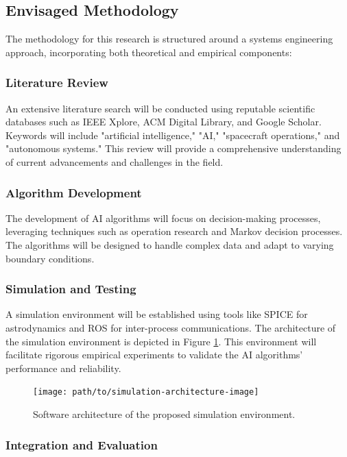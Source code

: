 \documentclass[a4paper, 11pt]{article}
\begin{document}
\subsection{Envisaged Methodology}

The methodology for this research is structured around a systems engineering approach, incorporating both theoretical and empirical components:

\subsubsection{Literature Review}

An extensive literature search will be conducted using reputable scientific databases such as IEEE Xplore, ACM Digital Library, and Google Scholar. Keywords will include "artificial intelligence," "AI," "spacecraft operations," and "autonomous systems." This review will provide a comprehensive understanding of current advancements and challenges in the field.

\subsubsection{Algorithm Development}

The development of AI algorithms will focus on decision-making processes, leveraging techniques such as operation research and Markov decision processes. The algorithms will be designed to handle complex data and adapt to varying boundary conditions.

\subsubsection{Simulation and Testing}

A simulation environment will be established using tools like SPICE for astrodynamics and ROS for inter-process communications. The architecture of the simulation environment is depicted in Figure \ref{fig:simulation-architecture}. This environment will facilitate rigorous empirical experiments to validate the AI algorithms' performance and reliability.

\begin{figure}[htbp]
    \centering
    \texttt{[image: path/to/simulation-architecture-image]}
    \caption{Software architecture of the proposed simulation environment.}
    \label{fig:simulation-architecture}
\end{figure}

\subsubsection{Integration and Evaluation}
\end{document}
